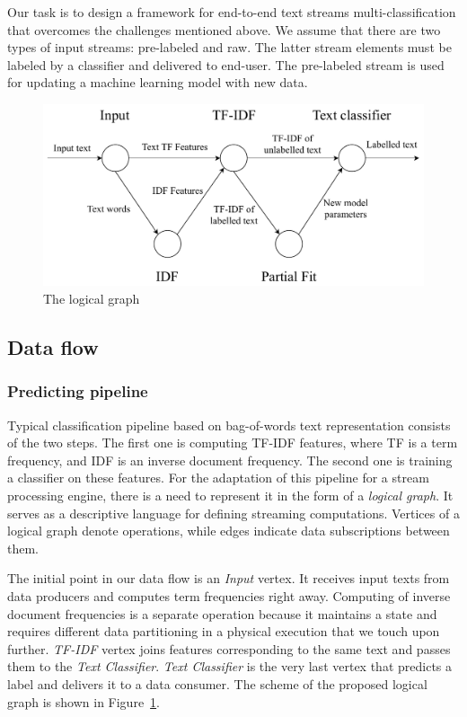 \label{fs-framework}

Our task is to design a framework for end-to-end text streams multi-classification that overcomes the challenges mentioned above. We assume that there are two types of input streams: pre-labeled and raw. The latter stream elements must be labeled by a classifier and delivered to end-user. The pre-labeled stream is used for updating a machine learning model with new data.

\begin{figure}[htbp]
  \centering
  \includegraphics[scale=0.48]{pics/logical-graph}
  \caption{The logical graph}
  \label {logical_graph}
\end{figure}

\subsection{Data flow \label{DF}}

\subsubsection{Predicting pipeline}

Typical classification pipeline based on bag-of-words text representation consists of the two steps. The first one is computing TF-IDF features, where TF is a term frequency, and IDF is an inverse document frequency. The second one is training a classifier on these features. For the adaptation of this pipeline for a stream processing engine, there is a need to represent it in the form of a {\em logical graph}. It serves as a descriptive language for defining streaming computations. Vertices of a logical graph denote operations, while edges indicate data subscriptions between them. 

The initial point in our data flow is an {\em Input} vertex. It receives input texts from data producers and computes term frequencies right away. Computing of inverse document frequencies is a separate operation because it maintains a state and requires different data partitioning in a physical execution that we touch upon further. {\em TF-IDF} vertex joins features corresponding to the same text and passes them to the {\em Text Classifier}. {\em Text Classifier} is the very last vertex that predicts a label and delivers it to a data consumer. The scheme of the proposed logical graph is shown in Figure~\ref{logical_graph}.


